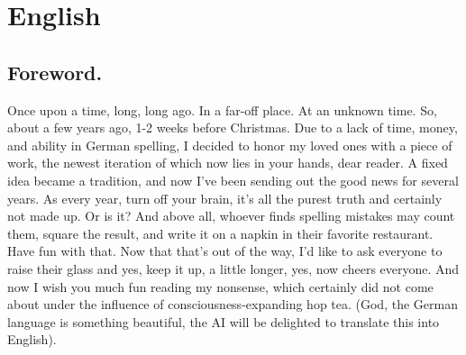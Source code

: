 \documentclass{article}
\begin{document}
  
\section{English}
  \subsection{Foreword.}
  \noindent 
  Once upon a time, long, long ago. In a far-off place. At an unknown time. So,
  about a few years ago, 1-2 weeks before Christmas. Due to a lack of time, money, and ability in German spelling,
  I decided to honor my loved ones with a piece of work, the newest iteration of which now lies in your hands,
  dear reader. A fixed idea became a tradition, and now I've been sending out the good news for several years. As
  every year, turn off your brain, it's all the purest truth and certainly not made up. Or is it? And above all,
  whoever finds spelling mistakes may count them, square the result, and write it on a napkin in their favorite
  restaurant. Have fun with that. Now that that's out of the way, I'd like to ask everyone to raise their glass
  and yes, keep it up, a little longer, yes, now cheers everyone. And now I wish you much fun reading my nonsense,
  which certainly did not come about under the influence of consciousness-expanding hop tea. (God, the German
  language is something beautiful, the AI will be delighted to translate this into English).\\
\end{document}
